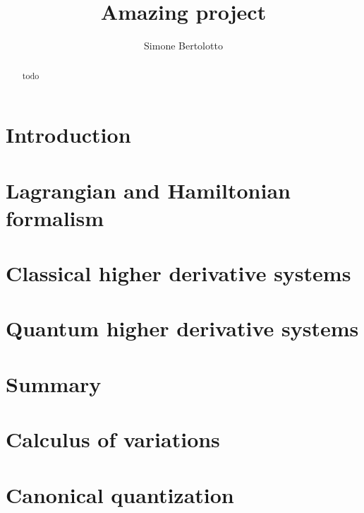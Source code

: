 \documentclass[a4paper]{article}
\title{Amazing project}
\author{Simone Bertolotto}
\theoremstyle{definition}
\numberwithin{equation}{section}
\begin{document}
  \maketitle

  \begin{abstract}
    todo
  \end{abstract}

  \newpage

  \section{Introduction}\label{section: introduction}
  

  \section{Lagrangian and Hamiltonian formalism}\label{section: lagrangin and
  hamiltonian formalism}
  

  \section{Classical higher derivative systems}\label{section: classical higher
  derivative systems}
  

  \section{Quantum higher derivative systems}\label{section: quantum higher
  derivative systems}
  

  \section{Summary}\label{section: summary}
  

  \newpage

  \begin{appendices}
    \section{Calculus of variations}\label{appendix: calculus of variation}
    

    \section{Canonical quantization}\label{appendix:canonical_quantization}
    
  \end{appendices}

  \newpage

  \printbibliography{}
\end{document}
